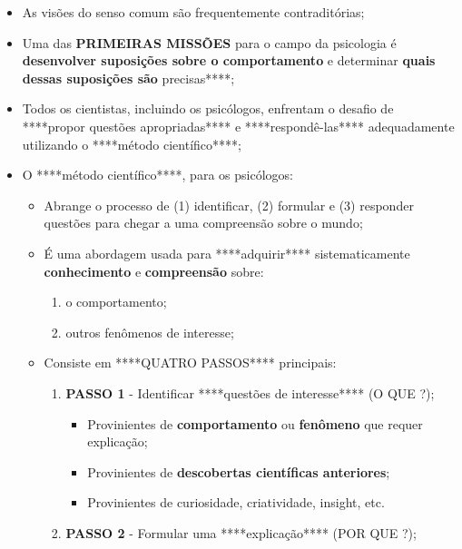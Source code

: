\documentclass[
]{book}
\providecommand{\tightlist}{%
  \setlength{\itemsep}{0pt}\setlength{\parskip}{0pt}}
\begin{document}
\begin{itemize}
\tightlist
\item
  As visões do senso comum são frequentemente contraditórias;
\item
  Uma das \textbf{PRIMEIRAS MISSÕES} para o campo da psicologia é \textbf{desenvolver suposições sobre o comportamento} e determinar \textbf{quais dessas suposições são }precisas****;
\item
  Todos os cientistas, incluindo os psicólogos, enfrentam o desafio de ****propor questões apropriadas**** e ****respondê-las**** adequadamente utilizando o ****método científico****;
\item
  O ****método científico****, para os psicólogos:

  \begin{itemize}
  \tightlist
  \item
    Abrange o processo de (1) identificar, (2) formular e (3) responder questões para chegar a uma compreensão sobre o mundo;
  \item
    É uma abordagem usada para ****adquirir**** sistematicamente \textbf{conhecimento} e \textbf{compreensão} sobre:

    \begin{enumerate}
    \def\labelenumi{\alph{enumi}.}
    \tightlist
    \item
      o comportamento;
    \item
      outros fenômenos de interesse;
    \end{enumerate}
  \item
    Consiste em ****QUATRO PASSOS**** principais:

    \begin{enumerate}
    \def\labelenumi{\alph{enumi}.}
    \tightlist
    \item
      \textbf{PASSO 1} - Identificar ****questões de interesse**** (O QUE ?);

      \begin{itemize}
      \tightlist
      \item
        Provinientes de \textbf{comportamento} ou \textbf{fenômeno} que requer explicação;
      \item
        Provinientes de \textbf{descobertas científicas anteriores};
      \item
        Provinientes de curiosidade, criatividade, insight, etc.
      \end{itemize}
    \item
      \textbf{PASSO 2} - Formular uma ****explicação**** (POR QUE ?);


\end{enumerate}
\end{itemize}
\end{itemize}
\end{document}
